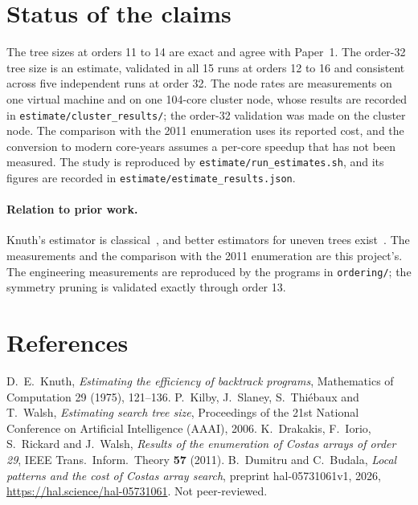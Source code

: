 \documentclass[11pt,a4paper,oneside]{report}
\makeatletter
\theoremstyle{definition}
\newenvironment{paperrefs}{\section*{References}\list{\@biblabel{\@arabic\c@enumiv}}{\settowidth\labelwidth{\@biblabel{99}}\leftmargin\labelwidth\advance\leftmargin\labelsep\usecounter{enumiv}\let\p@enumiv\@empty\renewcommand\theenumiv{\@arabic\c@enumiv}}\sloppy\small}{\endlist}
\makeatother
\begin{document}
\section{Status of the claims}\label{p9-sec:status}
The tree sizes at orders 11 to 14 are exact and agree with Paper~1. The order-32 tree size is an
estimate, validated in all 15 runs at orders 12 to 16 and consistent across five independent runs at
order 32. The node rates are measurements on one virtual machine and on one 104-core cluster node, whose results are recorded in \texttt{estimate/cluster\_results/}; the order-32 validation was made on the cluster node. The comparison with the 2011 enumeration uses its
reported cost, and the conversion to modern core-years assumes a per-core speedup that has not been
measured. The study is reproduced by \texttt{estimate/run\_estimates.sh}, and its figures are recorded in
\texttt{estimate/estimate\_results.json}.

\paragraph{Relation to prior work.} Knuth's estimator is classical~\cite{p9-knuth1975}, and better estimators
for uneven trees exist~\cite{p9-kilby2006}. The measurements and the comparison with the 2011 enumeration are
this project's. The engineering measurements are reproduced by the programs in \texttt{ordering/}; the symmetry pruning is validated exactly through order 13.
\begin{paperrefs}
 D.~E.~Knuth, \emph{Estimating the efficiency of backtrack programs}, Mathematics of Computation 29 (1975), 121--136.
 P.~Kilby, J.~Slaney, S.~Thi\'ebaux and T.~Walsh, \emph{Estimating search tree size}, Proceedings of the 21st National Conference on Artificial Intelligence (AAAI), 2006.
 K.~Drakakis, F.~Iorio, S.~Rickard and J.~Walsh,
\emph{Results of the enumeration of Costas arrays of order 29}, IEEE Trans.\
Inform.\ Theory \textbf{57} (2011).
 B.~Dumitru and C.~Budala, \emph{Local patterns and the cost of Costas array search}, preprint hal-05731061v1, 2026, \url{https://hal.science/hal-05731061}. Not peer-reviewed.
\end{paperrefs}

\clearpage
\end{document}
